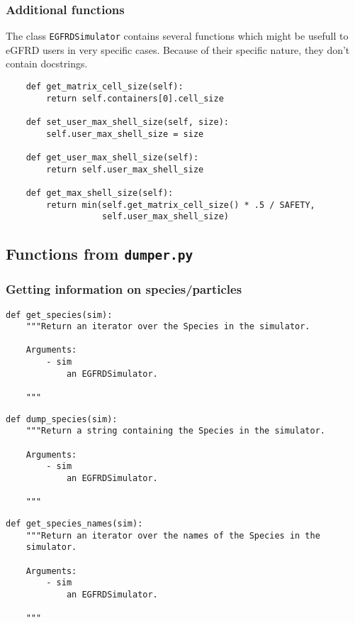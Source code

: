 \documentclass[a4paper,10pt]{article}
\begin{document}
\subsubsection{Additional functions}
The class \texttt{EGFRDSimulator} contains several functions which might be usefull to eGFRD users in very specific cases. Because of their specific nature, they don't contain docstrings. 
\begin{verbatim}
    def get_matrix_cell_size(self):
        return self.containers[0].cell_size

    def set_user_max_shell_size(self, size):
        self.user_max_shell_size = size

    def get_user_max_shell_size(self):
        return self.user_max_shell_size

    def get_max_shell_size(self):
        return min(self.get_matrix_cell_size() * .5 / SAFETY,
                   self.user_max_shell_size)
\end{verbatim}

\subsection{Functions from \texttt{dumper.py}}

\subsubsection{Getting information on species/particles}
\begin{verbatim}
def get_species(sim):
    """Return an iterator over the Species in the simulator.

    Arguments:
        - sim
            an EGFRDSimulator.

    """
\end{verbatim}

\begin{verbatim}
def dump_species(sim):
    """Return a string containing the Species in the simulator.

    Arguments:
        - sim
            an EGFRDSimulator.

    """
\end{verbatim}

\begin{verbatim}
def get_species_names(sim):
    """Return an iterator over the names of the Species in the 
    simulator.

    Arguments:
        - sim
            an EGFRDSimulator.

    """
\end{verbatim}
\end{document}
